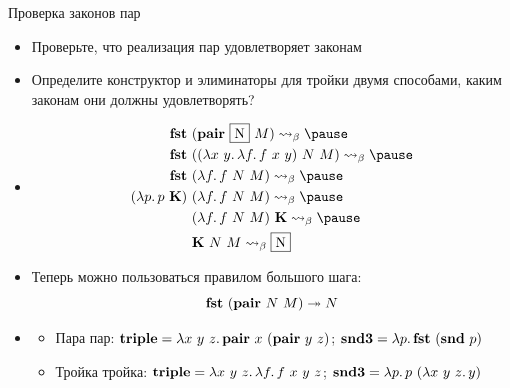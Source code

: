     \begin{frame}[fragile]{Проверка законов пар}
        \begin{itemize}
            \item[\todo] Проверьте, что реализация пар удовлетворяет законам
            \item[\todo] Определите конструктор и элиминаторы для тройки двумя способами, каким законам они должны удовлетворять?
            \item[\answer] \pause
            \begin{align*}
                \term{fst} \ap &(\term{pair} \ap \framebox{N} \ap M)
                \step_\beta \pause \\
                \term{fst} \ap &((\lambda x~y\ldotp \lambda f \ldotp f \ap x \ap y) \ap N \ap M)
                \step_\beta \pause \\
                \term{fst} \ap &(\lambda f \ldotp f \ap N \ap M)
                \step_\beta \pause \\
                (\lambda p \ldotp p \ap \term{K}) \ap &(\lambda f \ldotp f \ap N \ap M)
                \step_\beta \pause \\
                &(\lambda f \ldotp f \ap N \ap M) \ap \term{K}
                \step_\beta \pause \\
                &\term{K} \ap N \ap M \step_{\beta} \framebox{N}
            \end{align*}
            \item Теперь можно пользоваться правилом большого шага:
            \begin{equation*}
                \mathbf{fst} ~ (\mathbf{pair} ~ N ~ M) \twoheadrightarrow N
            \end{equation*}
            \item[\answer]
            \begin{itemize}
                \item Пара пар: $\mathbf{triple} = \lambda x~y~z\ldotp \mathbf{pair}~ x~ (\mathbf{pair} ~ y ~ z)$; $\mathbf{snd3} = \lambda p\ldotp \mathbf{fst}~(\mathbf{snd}~ p)$
                \item Тройка тройка: $\mathbf{triple} = \lambda x~y~z\ldotp\lambda f\ldotp f~ x~ y~ z$; $\mathbf{snd3} = \lambda p\ldotp p~(\lambda x~y~z\ldotp y)$
            \end{itemize}
        \end{itemize}
    \end{frame}

